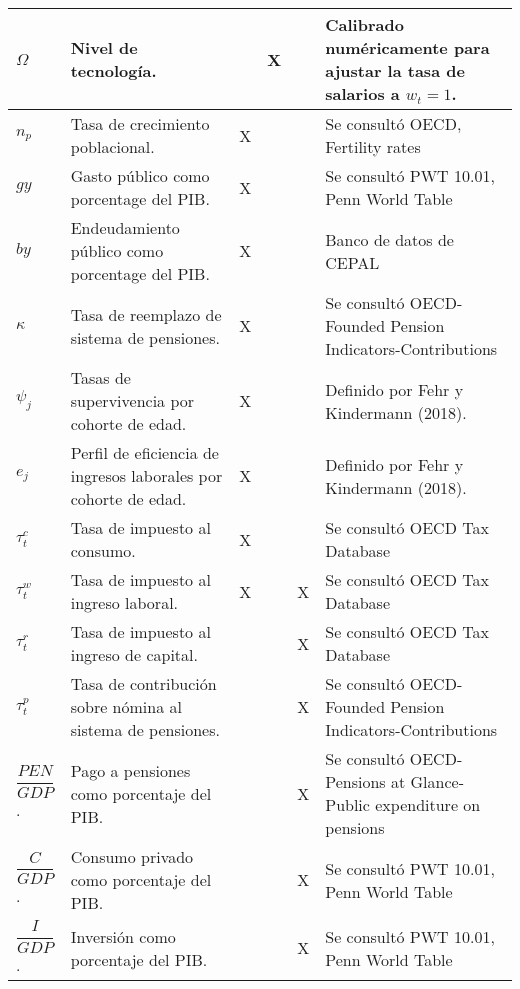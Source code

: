 \documentclass[10pt,a4paper]{article}
\begin{document}
\begin{landscape}
\begin{longtable}{p{1cm} p{6cm} p{1cm} p{1cm} p{1cm} p{5cm}}
        \hline 
        $\Omega$ & Nivel de tecnología. &  & X &  &  Calibrado numéricamente para ajustar la tasa de salarios a $w_t=1$. \\
        \hline 
        $n_p$ & Tasa de crecimiento poblacional. & X &  &  &  Se consultó OECD, Fertility rates \\
        \hline 
        $gy$ & Gasto público como porcentage del PIB. & X &  &  &  Se consultó PWT 10.01, Penn World Table \\
        \hline 
        $by$ & Endeudamiento público como porcentage del PIB. & X &  &  &  Banco de datos de CEPAL \\
        \hline 
        $\kappa$ & Tasa de reemplazo de sistema de pensiones. & X &  &  &  Se consultó OECD-Founded Pension Indicators-Contributions \\
        \hline 
        $\psi_j$ & Tasas de supervivencia por cohorte de edad. & X &  &  &  Definido por Fehr y Kindermann (2018). \\
        \hline 
        $e_j$ & Perfil de eficiencia de ingresos laborales por cohorte de edad. & X &  &  &  Definido por Fehr y Kindermann (2018). \\
        \hline 
        $\tau_t^c$ & Tasa de impuesto al consumo. & X &  &  &  Se consultó OECD Tax Database \\
        \hline 
        $\tau_t^w$ & Tasa de impuesto al ingreso laboral. & X &  & X &  Se consultó OECD Tax Database \\
        \hline 
        $\tau_t^r$ & Tasa de impuesto al ingreso de capital. &  &  & X &  Se consultó OECD Tax Database \\
        \hline 
        $\tau_t^p$ & Tasa de contribución sobre nómina al sistema de pensiones. &  &  & X &  Se consultó OECD-Founded Pension Indicators-Contributions \\
        \hline 
        $\dfrac{PEN}{GDP}$. & Pago a pensiones como porcentaje del PIB. &  &  & X &  Se consultó OECD-Pensions at Glance-Public expenditure on pensions \\
        \hline 
        $\dfrac{C}{GDP}$. & Consumo privado como porcentaje del PIB. &  &  & X &  Se consultó PWT 10.01, Penn World Table \\
        \hline 
        $\dfrac{I}{GDP}$. & Inversión como porcentaje del PIB. &  &  & X &  Se consultó PWT 10.01, Penn World Table \\
        \hline 
        

\end{longtable}
\end{landscape}
\end{document}
